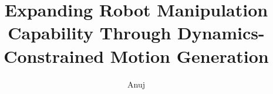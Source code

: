 \documentclass[defaultstyle,11pt]{thesis}
\title{Expanding Robot Manipulation Capability Through Dynamics-Constrained Motion Generation}
\author{Anuj}{Pasricha}
\begin{document}

% 

% 









\nocite{*}		%

% 
\end{document}
